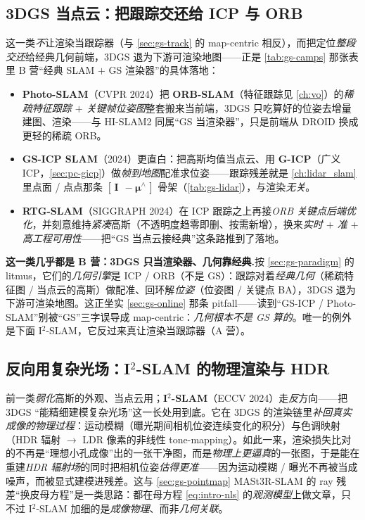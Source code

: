 \subsection{3DGS 当点云：把跟踪交还给 ICP 与 ORB}

这一类\emph{不}让渲染当跟踪器（与 \cref{sec:gs-track} 的 map-centric 相反），而把定位\emph{整段交还}给经典几何前端，3DGS 退为下游可渲染地图——正是 \cref{tab:gs-camps} 那张表里 B 营“经典 SLAM $+$ GS 渲染器”的具体落地：
\begin{itemize}
  \item \textbf{Photo-SLAM}（CVPR 2024）把 \textbf{ORB-SLAM}（特征跟踪见 \cref{ch:vo}）的\emph{稀疏特征跟踪 $+$ 关键帧位姿图}整套搬来当前端，3DGS 只吃算好的位姿去增量建图、渲染——与 HI-SLAM2 同属“GS 当渲染器”，只是前端从 DROID 换成更轻的稀疏 ORB。
  \item \textbf{GS-ICP SLAM}（2024）更直白：把高斯均值当点云、用 \textbf{G-ICP}（广义 ICP，\cref{sec:pc-gicp}）做\emph{帧到地图}配准求位姿——跟踪残差就是 \cref{ch:lidar_slam} 里点面 / 点点那条 $[\,\mathbf I\ \ -\boldsymbol\mu^\wedge\,]$ 骨架（\cref{tab:gs-lidar}），与渲染\emph{无关}。
  \item \textbf{RTG-SLAM}（SIGGRAPH 2024）在 ICP 跟踪之上再接\emph{ORB 关键点后端优化}，并刻意维持\emph{紧凑}高斯（不透明度趋零即删、按需新增），换来\emph{实时 $+$ 准 $+$ 高工程可用性}——把“GS 当点云接经典”这条路推到了落地。
\end{itemize}

\begin{note}
\textbf{这一类几乎都是 B 营：3DGS 只当渲染器、几何靠经典.}\;按 \cref{sec:gs-paradigm} 的 litmus，它们的\emph{几何引擎}是 ICP / ORB（不是 GS）：跟踪对着\emph{经典几何}（稀疏特征图 / 当点云的高斯）做配准、回环解\emph{位姿}（位姿图 / 关键点 BA），3DGS 退为下游可渲染地图。这正坐实 \cref{sec:gs-online} 那条 pitfall——读到“GS-ICP / Photo-SLAM”别被“GS”三字误导成 map-centric：\emph{几何根本不是 GS 算的}。唯一的例外是下面 I$^2$-SLAM，它反过来真让渲染当跟踪器（A 营）。
\end{note}

\subsection{反向用复杂光场：I\texorpdfstring{$^2$}{2}-SLAM 的物理渲染与 HDR}

前一类\emph{弱化}高斯的外观、当点云用；\textbf{I$^2$-SLAM}（ECCV 2024）走\emph{反}方向——把 3DGS “能精细建模复杂光场”这一长处用到底。它在 3DGS 的渲染链里\emph{补回真实成像的物理过程}：运动模糊（曝光期间相机位姿连续变化的积分）与色调映射（HDR 辐射 $\to$ LDR 像素的非线性 tone-mapping）。如此一来，渲染损失比对的不再是“理想小孔成像”出的一张干净图，而是\emph{物理上更逼真}的一张图，于是能在重建\emph{HDR 辐射场}的同时把相机位姿\emph{估得更准}——因为运动模糊 / 曝光不再被当成噪声，而被显式建模进残差。这与 \cref{sec:gs-pointmap} MASt3R-SLAM 的 ray 残差“换皮母方程”是一类思路：都在母方程 \cref{eq:intro-nls} 的\emph{观测模型}上做文章，只不过 I$^2$-SLAM 加细的是\emph{成像物理}、而非\emph{几何关联}。

